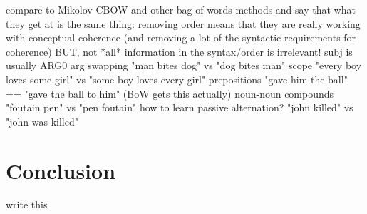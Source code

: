 \documentclass[11pt,letterpaper]{article}
\begin{document}
compare to Mikolov CBOW and other bag of words methods and say that
what they get at is the same thing:
removing order means that they are really working with conceptual coherence
(and removing a lot of the syntactic requirements for coherence)
BUT, not *all* information in the syntax/order is irrelevant!
subj is usually ARG0
arg swapping "man bites dog" vs "dog bites man"
scope "every boy loves some girl" vs "some boy loves every girl"
prepositions "gave him the ball" == "gave the ball to him" (BoW gets this actually)
noun-noun compounds "foutain pen" vs "pen foutain"
how to learn passive alternation? "john killed" vs "john was killed"

\section{Conclusion} %
write this



{}

\end{document}
